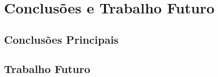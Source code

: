 \chapter{Conclusões e Trabalho Futuro}
\label{chap:conclusao}

\section{Conclusões Principais}
\label{sec:principais}

\section{Trabalho Futuro}
\label{sec:futuro}

